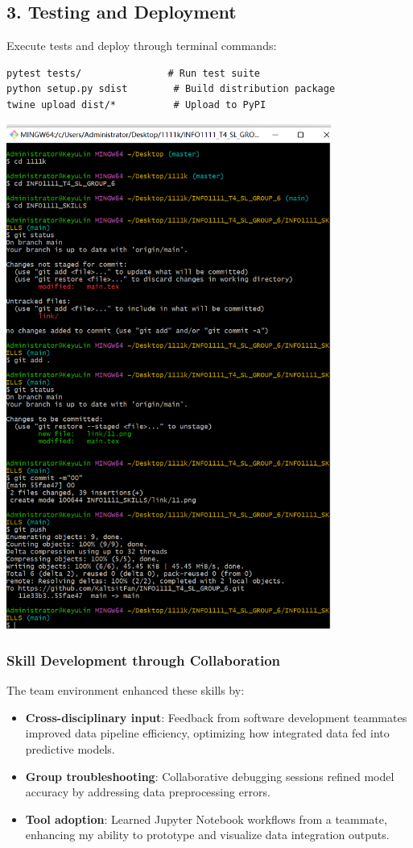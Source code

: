\documentclass[a4paper, 11pt]{report}
\begin{document}
\subsection*{3. Testing and Deployment}
Execute tests and deploy through terminal commands:
\begin{verbatim}
pytest tests/               # Run test suite
python setup.py sdist        # Build distribution package
twine upload dist/*          # Upload to PyPI
\end{verbatim}

\begin{center}
\includegraphics[width=0.8\textwidth]{link/33.png}
\end{center}
\subsubsection*{Skill Development through Collaboration}
The team environment enhanced these skills by:
\begin{itemize}
    \item \textbf{Cross-disciplinary input}: Feedback from software development teammates improved data pipeline efficiency, optimizing how integrated data fed into predictive models.
    \item \textbf{Group troubleshooting}: Collaborative debugging sessions refined model accuracy by addressing data preprocessing errors.
    \item \textbf{Tool adoption}: Learned Jupyter Notebook workflows from a teammate, enhancing my ability to prototype and visualize data integration outputs.
\end{itemize}
\end{document}
